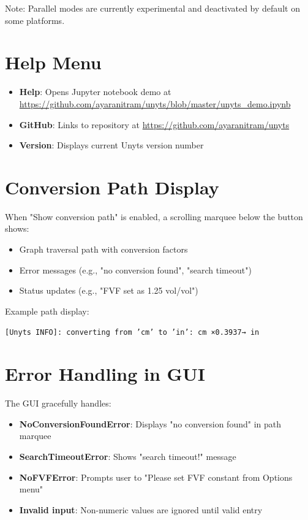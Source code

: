 \documentclass[11pt,a4paper]{report}
\begin{document}
Note: Parallel modes are currently experimental and deactivated by default on some platforms.

\section{Help Menu}

\begin{itemize}
\item \textbf{Help}: Opens Jupyter notebook demo at \url{https://github.com/ayaranitram/unyts/blob/master/unyts_demo.ipynb}
\item \textbf{GitHub}: Links to repository at \url{https://github.com/ayaranitram/unyts}
\item \textbf{Version}: Displays current Unyts version number
\end{itemize}

\section{Conversion Path Display}

When "Show conversion path" is enabled, a scrolling marquee below the button shows:

\begin{itemize}
\item Graph traversal path with conversion factors
\item Error messages (e.g., "no conversion found", "search timeout")
\item Status updates (e.g., "FVF set as 1.25 vol/vol")
\end{itemize}

Example path display:
\begin{center}
\texttt{[Unyts INFO]: converting from 'cm' to 'in': cm ×0.3937→ in}
\end{center}

\section{Error Handling in GUI}

The GUI gracefully handles:

\begin{itemize}
\item \textbf{NoConversionFoundError}: Displays "no conversion found" in path marquee
\item \textbf{SearchTimeoutError}: Shows "search timeout!" message
\item \textbf{NoFVFError}: Prompts user to "Please set FVF constant from Options menu"
\item \textbf{Invalid input}: Non-numeric values are ignored until valid entry
\end{itemize}
\end{document}
